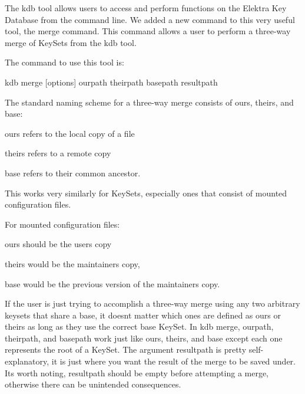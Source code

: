 The kdb tool allows users to access and perform functions on the Elektra Key Database from the command line. We added a new command to this very useful tool, the {\ttfamily merge} command. This command allows a user to perform a three-\/way merge of Key\+Sets from the {\ttfamily kdb} tool.

The command to use this tool is\+:


\begin{DoxyCode}
kdb merge [options] ourpath theirpath basepath resultpath
\end{DoxyCode}


The standard naming scheme for a three-\/way merge consists of {\ttfamily ours}, {\ttfamily theirs}, and {\ttfamily base}\+:


\begin{DoxyItemize}
\item {\ttfamily ours} refers to the local copy of a file
\item {\ttfamily theirs} refers to a remote copy
\item {\ttfamily base} refers to their common ancestor.
\end{DoxyItemize}

This works very similarly for Key\+Sets, especially ones that consist of mounted configuration files.

For mounted configuration files\+:


\begin{DoxyItemize}
\item {\ttfamily ours} should be the user\textquotesingle{}s copy
\item {\ttfamily theirs} would be the maintainers copy,
\item {\ttfamily base} would be the previous version of the maintainer\textquotesingle{}s copy.
\end{DoxyItemize}

If the user is just trying to accomplish a three-\/way merge using any two arbitrary keysets that share a base, it doesn\textquotesingle{}t matter which ones are defined as {\ttfamily ours} or {\ttfamily theirs} as long as they use the correct base Key\+Set. In {\ttfamily kdb merge}, {\ttfamily ourpath}, {\ttfamily theirpath}, and {\ttfamily basepath} work just like {\ttfamily ours}, {\ttfamily theirs}, and {\ttfamily base} except each one represents the root of a Key\+Set. The argument {\ttfamily resultpath} is pretty self-\/explanatory, it is just where you want the result of the merge to be saved under. It\textquotesingle{}s worth noting, {\ttfamily resultpath} should be empty before attempting a merge, otherwise there can be unintended consequences.

